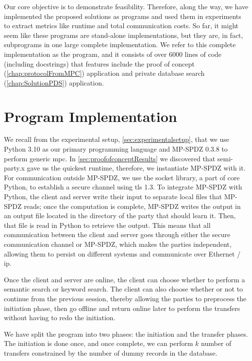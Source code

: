 Our core objective is to demonstrate feasibility. Therefore, along the way, we have implemented the proposed solutions as programs and used them in experiments to extract metrics like runtime and total communication costs. So far, it might seem like these programs are stand-alone implementations, but they are, in fact, subprograms in one large complete implementation. We refer to this complete implementation as the program, and it consists of over 6000 lines of code (including docstrings) that features include the proof of concept (\cref{chap:protocolFromMPC}) application and private database search (\cref{chap:SolutionPDS}) application.

\section{Program Implementation}

We recall from the experimental setup, \cref{sec:experimentalsetup}, that we use Python 3.10 as our primary programming language and MP-SPDZ 0.3.8 to perform generic \acrshort{mpc}. In \cref{sec:proofofconceptResults} we discovered that semi-party.x gave us the quickest runtime, therefore, we instantiate MP-SPDZ with it. For communication outside MP-SPDZ, we use the socket library, a part of core Python, to establish a secure channel using \acrfull{tls} 1.3. To integrate MP-SPDZ with Python, the client and server write their input to separate local files that MP-SPDZ reads; once the computation is complete, MP-SPDZ writes the output in an output file located in the directory of the party that should learn it. Then, that file is read in Python to retrieve the output. This means that all communication between the client and server goes through either the secure communication channel or MP-SPDZ, which makes the parties independent, allowing them to persist on different systems and communicate over Ethernet / \acrfull{ip}. 

Once the client and server are online, the client can choose whether to perform a semantic search or keyword search. The client can also choose whether or not to continue from the previous session, thereby allowing the parties to preprocess the initiation phase, then go offline and return online later to perform the transfers without having to redo the initiation.

We have split the program into two phases: the initiation and the transfer phases. The initiation is done once, and once complete, we can perform $ k $ number of transfers constrained by the number of dummy records in the database.

